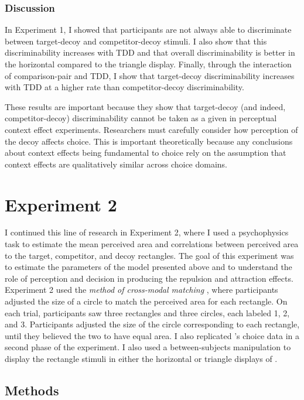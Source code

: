 \subsubsection{Discussion}
In Experiment 1, I showed that participants are not always able to discriminate between target-decoy and competitor-decoy stimuli. I also show that this discriminability increases with TDD and that overall discriminability is better in the horizontal compared to the triangle display. Finally, through the interaction of comparison-pair and TDD, I show that target-decoy discriminability increases with TDD at a higher rate than competitor-decoy discriminability. 

These results are important because they show that target-decoy (and indeed, competitor-decoy) discriminability cannot be taken as a given in perceptual context effect experiments. Researchers must carefully consider how perception of the decoy affects choice. This is important theoretically because any conclusions about context effects being fundamental to choice \parencite{trueblood2013not} rely on the assumption that context effects are qualitatively similar across choice domains.

\section{Experiment 2}
I continued this line of research in Experiment 2, where I used a psychophysics task to estimate the mean perceived area and correlations between perceived area to the target, competitor, and decoy rectangles. The goal of this experiment was to estimate the parameters of the model presented above and to understand the role of perception and decision in producing the repulsion and attraction effects. Experiment 2 used the \textit{method of cross-modal matching} \parencite{stevensCrossmodalityMatchingBrightness1965}, where participants adjusted the size of a circle to match the perceived area for each rectangle. On each trial, participants saw three rectangles and three circles, each labeled 1, 2, and 3. Participants adjusted the size of the circle corresponding to each rectangle, until they believed the two to have equal area. I also replicated \textcite{spektorWhenGoodLooks2018b}'s choice data in a second phase of the experiment. I also used a between-subjects manipulation to display the rectangle stimuli in either the horizontal or triangle displays of \textcite{spektorWhenGoodLooks2018b}.

\subsection{Methods}
